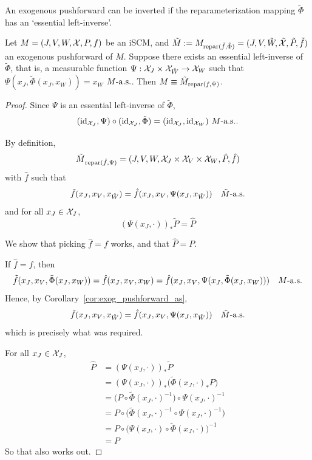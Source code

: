 An exogenous pushforward can be inverted if the reparameterization mapping $\tilde\Phi$ has an `essential left-inverse'.
\begin{Lem}\label{lem:exogenous_pushforward_left-inverse}
  Let $M = \left ( J, V, W, \mathcal{X}, P, f \right )$ be an iSCM, and $\tilde{M} := M_{\mathrm{repar}({\tilde{f}},{\tilde{\Phi}})} = ( J, V, \tilde{W}, \tilde{\mathcal{X}}, \tilde{P}, \tilde{f} )$ an exogenous pushforward of $M$.
  Suppose there exists an essential left-inverse of $\tilde\Phi$, that is, a measurable function $\Psi : \mathcal{X}_J \times \mathcal{X}_{\tilde{W}} \to \mathcal{X}_W$ such that $\Psi(x_J,\tilde\Phi(x_J,x_W)) = x_W$ $M\text{-a.s.}$.
  Then $M \equiv \tilde{M}_{\mathrm{repar}({f},{\Psi})}$.
\end{Lem}
\begin{proof}
  Since $\Psi$ is an essential left-inverse of $\tilde\Phi$,
  $$(\mathrm{id}_{\mathcal{X}_J},\Psi) \circ (\mathrm{id}_{\mathcal{X}_J},\tilde\Phi) = (\mathrm{id}_{\mathcal{X}_J},\mathrm{id}_{\mathcal{X}_W})\ M\text{-a.s.}.$$

  By definition,
  $${\tilde M}_{\mathrm{repar}({\hat f},{\Psi})} = ( J, V, W, \mathcal{X}_J \times \mathcal{X}_V \times \mathcal{X}_W, \hat{P}, \hat{f} )$$ 
  with $\hat{f}$ such that
  $$\tilde{f}(x_J,x_V,x_{\tilde{W}}) = \hat{f}(x_J,x_V,\Psi(x_J,x_{\tilde{W}})) \quad \tilde{M}\text{-a.s.}$$
  and for all $x_J \in \mathcal{X}_J$, 
    $$(\Psi(x_J,\cdot))_* \tilde{P} = \hat{P}$$

  We show that picking $\hat f = f$ works, and that $\hat P = P$.

  If $\hat f = f$, then
  $$\tilde{f}(x_J,x_V,\tilde\Phi(x_J,x_W)) = \hat{f}(x_J,x_V,x_W) = \hat{f}(x_J,x_V,\Psi(x_J,\tilde\Phi(x_J,x_W))) \quad M\text{-a.s.}$$
  Hence, by Corollary~\ref{cor:exog_pushforward_as},
  $$\tilde{f}(x_J,x_V,x_{\tilde{W}}) = \hat{f}(x_J,x_V,\Psi(x_J,x_{\tilde{W}})) \quad \tilde{M}\text{-a.s.}$$
  which is precisely what was required.

  For all $x_J \in \mathcal{X}_J$, 
    \begin{equation*}\begin{split}
      \hat P 
      &= (\Psi(x_J,\cdot))_* \tilde{P} \\
      &= (\Psi(x_J,\cdot))_* \big(\tilde{\Phi}(x_J,\cdot)_* P\big) \\
      &= \big(P \circ \tilde{\Phi}(x_J,\cdot)^{-1}\big) \circ \Psi(x_J,\cdot)^{-1} \\
      &= P \circ \big(\tilde{\Phi}(x_J,\cdot)^{-1} \circ \Psi(x_J,\cdot)^{-1}\big) \\
      &= P \circ \big(\Psi(x_J,\cdot) \circ \tilde{\Phi}(x_J,\cdot)\big)^{-1} \\
      &= P
    \end{split}\end{equation*}
  So that also works out.
\end{proof}
